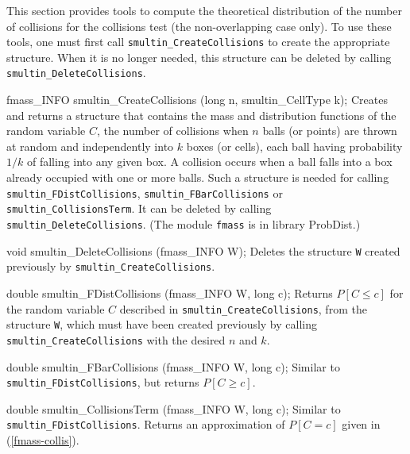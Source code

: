 \fi  %

\ifdetailed  %


This section provides tools to compute the theoretical distribution
of the number of collisions for the collisions test (the non-overlapping
case only).
To use these tools, one must first call {\tt smultin\_CreateCollisions}
to create the appropriate structure.  When it is no longer needed,
this structure can be deleted by
calling {\tt smultin\_DeleteCollisions}.

\code


fmass_INFO smultin_CreateCollisions (long n, smultin_CellType k);
\endcode
 \tab Creates and returns a structure that contains the mass and
   distribution functions of the random variable $C$,
   the number of collisions when $n$ balls (or points)
   are thrown at random and independently into $k$ boxes (or cells), each
   ball having probability $1/k$ of falling into any given box.
   A collision occurs when a ball falls into a box already occupied
   with one or more balls.
   Such a structure is needed for calling
   {\tt smultin\_FDistCollisions}, {\tt smultin\_FBarCollisions} or
   {\tt smultin\_CollisionsTerm}. It can be deleted by calling
   {\tt smultin\_DeleteCollisions}.
  (The module {\tt fmass} is in library ProbDist.)

 \endtab
\code


void smultin_DeleteCollisions (fmass_INFO W);
\endcode
  \tab Deletes the structure {\tt W} created previously
   by {\tt smultin\_CreateCollisions}.
 \endtab
\code


double smultin_FDistCollisions (fmass_INFO W, long c);
\endcode
 \tab Returns $P[C\le c]$ for the random variable $C$
  described in {\tt smultin\_CreateCollisions}, from the structure
  {\tt W}, which must have been created previously by calling
  {\tt smultin\_CreateCollisions} with the desired $n$ and $k$.
 \endtab
\code


double smultin_FBarCollisions (fmass_INFO W, long c);
\endcode
 \tab  Similar to {\tt smultin\_FDistCollisions}, but returns $P[C\ge c]$.
\endtab
\code


double smultin_CollisionsTerm (fmass_INFO W, long c);
\endcode
 \tab  Similar to {\tt smultin\_FDistCollisions}. Returns an
   approximation of $P[C = c]$ given in (\ref{fmass-collis}).
 \endtab

\fi



